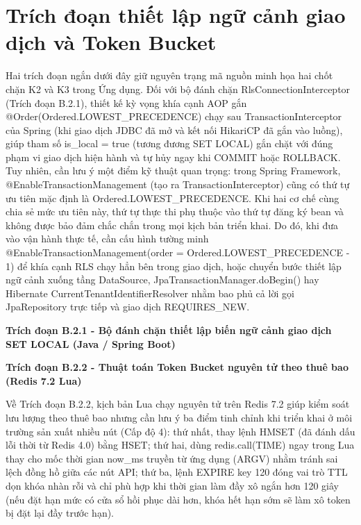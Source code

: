\section{Trích đoạn thiết lập ngữ cảnh giao dịch và Token Bucket}\label{v4-sec-B-2}

Hai trích đoạn ngắn dưới đây giữ nguyên trạng mã nguồn minh họa hai chốt chặn K2 và K3 trong Ứng dụng. Đối với bộ đánh chặn RlsConnectionInterceptor (Trích đoạn B.2.1), thiết kế kỳ vọng khía cạnh AOP gắn @Order(Ordered.LOWEST\_\allowbreak{}PRECEDENCE) chạy sau TransactionInterceptor của Spring (khi giao dịch JDBC đã mở và kết nối HikariCP đã gắn vào luồng), giúp tham số is\_\allowbreak{}local = true (tương đương SET LOCAL) gắn chặt với đúng phạm vi giao dịch hiện hành và tự hủy ngay khi COMMIT hoặc ROLLBACK. Tuy nhiên, cần lưu ý một điểm kỹ thuật quan trọng: trong Spring Framework, @EnableTransactionManagement (tạo ra TransactionInterceptor) cũng có thứ tự ưu tiên mặc định là Ordered.LOWEST\_\allowbreak{}PRECEDENCE. Khi hai cơ chế cùng chia sẻ mức ưu tiên này, thứ tự thực thi phụ thuộc vào thứ tự đăng ký bean và không được bảo đảm chắc chắn trong mọi kịch bản triển khai. Do đó, khi đưa vào vận hành thực tế, cần cấu hình tường minh @EnableTransactionManagement(order = Ordered.LOWEST\_\allowbreak{}PRECEDENCE - 1) để khía cạnh RLS chạy hẳn bên trong giao dịch, hoặc chuyển bước thiết lập ngữ cảnh xuống tầng DataSource, JpaTransactionManager.doBegin() hay Hibernate CurrentTenantIdentifierResolver nhằm bao phủ cả lời gọi JpaRepository trực tiếp và giao dịch REQUIRES\_\allowbreak{}NEW.

\par\Needspace{65bp}\noindent\textbf{Trích đoạn B.2.1 - Bộ đánh chặn thiết lập biến ngữ cảnh giao dịch SET LOCAL (Java / Spring Boot)}\par
{}

\par\Needspace{65bp}\noindent\textbf{Trích đoạn B.2.2 - Thuật toán Token Bucket nguyên tử theo thuê bao (Redis 7.2 Lua)}\par
{}

Về Trích đoạn B.2.2, kịch bản Lua chạy nguyên tử trên Redis 7.2 giúp kiểm soát lưu lượng theo thuê bao nhưng cần lưu ý ba điểm tinh chỉnh khi triển khai ở môi trường sản xuất nhiều nút (Cấp độ 4): thứ nhất, thay lệnh HMSET (đã đánh dấu lỗi thời từ Redis 4.0) bằng HSET; thứ hai, dùng redis.call(\textquotesingle TIME\textquotesingle) ngay trong Lua thay cho mốc thời gian now\_\allowbreak{}ms truyền từ ứng dụng (ARGV\cite{v4-03}) nhằm tránh sai lệch đồng hồ giữa các nút API; thứ ba, lệnh EXPIRE key 120 đóng vai trò TTL dọn khóa nhàn rỗi và chỉ phù hợp khi thời gian làm đầy xô ngắn hơn 120 giây (nếu đặt hạn mức có cửa sổ hồi phục dài hơn, khóa hết hạn sớm sẽ làm xô token bị đặt lại đầy trước hạn).

